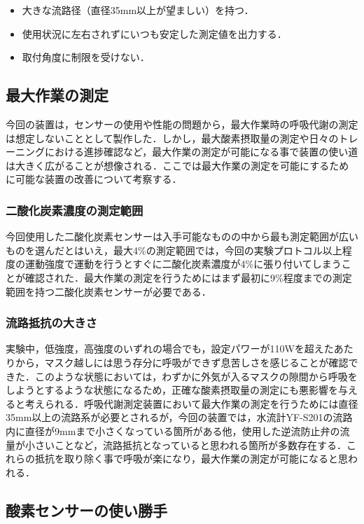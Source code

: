 \begin{itemize}
  \item 大きな流路径（直径35mm以上が望ましい）を持つ．
  \item 使用状況に左右されずにいつも安定した測定値を出力する．
  \item 取付角度に制限を受けない．
\end{itemize}

\subsection{最大作業の測定}

今回の装置は，センサーの使用や性能の問題から，最大作業時の呼吸代謝の測定は想定しないこととして製作した．しかし，最大酸素摂取量の測定や日々のトレーニングにおける進捗確認など，最大作業の測定が可能になる事で装置の使い道は大きく広がることが想像される．ここでは最大作業の測定を可能にするために可能な装置の改善について考察する．

\subsubsection{二酸化炭素濃度の測定範囲}

今回使用した二酸化炭素センサーは入手可能なものの中から最も測定範囲が広いものを選んだとはいえ，最大4\%の測定範囲では，今回の実験プロトコル以上程度の運動強度で運動を行うとすぐに二酸化炭素濃度が4\%に張り付いてしまうことが確認された．最大作業の測定を行うためにはまず最初に9\%程度までの測定範囲を持つ二酸化炭素センサーが必要である．

\subsubsection{流路抵抗の大きさ}

実験中，低強度，高強度のいずれの場合でも，設定パワーが110Wを超えたあたりから，マスク越しには思う存分に呼吸ができず息苦しさを感じることが確認できた．このような状態においては，わずかに外気が入るマスクの隙間から呼吸をしようとするような状態になるため，正確な酸素摂取量の測定にも悪影響を与えると考えられる．呼吸代謝測定装置において最大作業の測定を行うためには直径35mm以上の流路系が必要とされるが，今回の装置では，水流計YF-S201の流路内に直径が9mmまで小さくなっている箇所がある他，使用した逆流防止弁の流量が小さいことなど，流路抵抗となっていると思われる箇所が多数存在する．これらの抵抗を取り除く事で呼吸が楽になり，最大作業の測定が可能になると思われる．

\subsection{酸素センサーの使い勝手}

